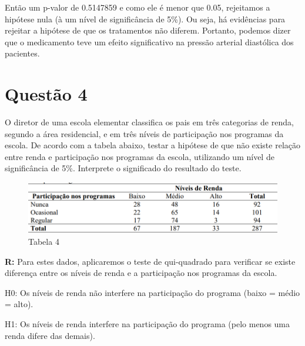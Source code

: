 \documentclass[
  letterpaper,
  DIV=11,
  numbers=noendperiod]{scrartcl}
\begin{document}
Então um p-valor de 0.5147859 e como ele é menor que 0.05, rejeitamos a
hipótese nula (à um nível de significância de 5\%). Ou seja, há
evidências para rejeitar a hipótese de que os tratamentos não diferem.
Portanto, podemos dizer que o medicamento teve um efeito significativo
na pressão arterial diastólica dos pacientes.

\section{Questão 4}\label{questuxe3o-4}

O diretor de uma escola elementar classifica os pais em três categorias
de renda, segundo a área residencial, e em três níveis de participação
nos programas da escola. De acordo com a tabela abaixo, testar a
hipótese de que não existe relação entre renda e participação nos
programas da escola, utilizando um nível de significância de 5\%.
Interprete o significado do resultado do teste.

\begin{figure}[H]

{\centering \includegraphics{imgs/q4-tabela.png}

}

\caption{Tabela 4}

\end{figure}%

\textbf{R:} Para estes dados, aplicaremos o teste de qui-quadrado para
verificar se existe diferença entre os níveis de renda e a participação
nos programas da escola.

H0: Os níveis de renda não interfere na participação do programa (baixo
= médio = alto).

H1: Os níveis de renda interfere na participação do programa (pelo menos
uma renda difere das demais).
\end{document}
